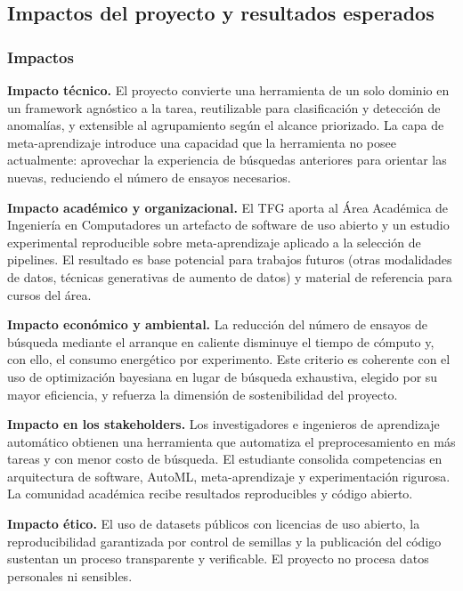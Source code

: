 \documentclass[12pt,letterpaper]{article}
\begin{document}
\subsection{Impactos del proyecto y resultados esperados}

\subsubsection{Impactos}

\textbf{Impacto técnico.} El proyecto convierte una herramienta de un solo dominio en un framework agnóstico a la tarea, reutilizable para clasificación y detección de anomalías, y extensible al agrupamiento según el alcance priorizado. La capa de meta-aprendizaje introduce una capacidad que la herramienta no posee actualmente: aprovechar la experiencia de búsquedas anteriores para orientar las nuevas, reduciendo el número de ensayos necesarios.

\textbf{Impacto académico y organizacional.} El TFG aporta al Área Académica de Ingeniería en Computadores un artefacto de software de uso abierto y un estudio experimental reproducible sobre meta-aprendizaje aplicado a la selección de pipelines. El resultado es base potencial para trabajos futuros (otras modalidades de datos, técnicas generativas de aumento de datos) y material de referencia para cursos del área.

\textbf{Impacto económico y ambiental.} La reducción del número de ensayos de búsqueda mediante el arranque en caliente disminuye el tiempo de cómputo y, con ello, el consumo energético por experimento. Este criterio es coherente con el uso de optimización bayesiana en lugar de búsqueda exhaustiva, elegido por su mayor eficiencia, y refuerza la dimensión de sostenibilidad del proyecto.

\textbf{Impacto en los stakeholders.} Los investigadores e ingenieros de aprendizaje automático obtienen una herramienta que automatiza el preprocesamiento en más tareas y con menor costo de búsqueda. El estudiante consolida competencias en arquitectura de software, AutoML, meta-aprendizaje y experimentación rigurosa. La comunidad académica recibe resultados reproducibles y código abierto.

\textbf{Impacto ético.} El uso de datasets públicos con licencias de uso abierto, la reproducibilidad garantizada por control de semillas y la publicación del código sustentan un proceso transparente y verificable. El proyecto no procesa datos personales ni sensibles.
\end{document}
